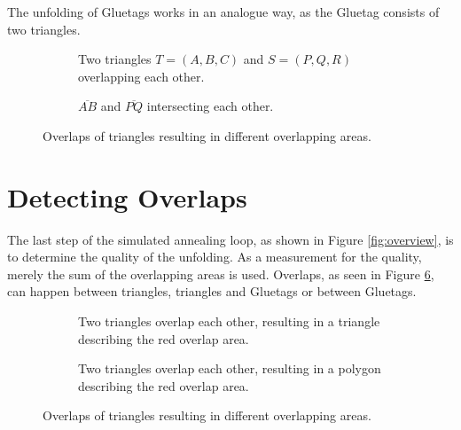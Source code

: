 \documentclass[draft,final]{vutinfth} %
\begin{document}
The unfolding of Gluetags works in an analogue way, as the Gluetag consists of two triangles.

\begin{figure}
\centering
\begin{subfigure}[t]{.4\textwidth}
	
  \caption{Two triangles $T = (A,B,C)$ and $S = (P,Q,R)$ overlapping each other.}
	\label{fig:figtrioverlap}
\end{subfigure}%
\hspace{.1\textwidth}
\begin{subfigure}[t]{.4\textwidth}
	
	\caption{$\overline{AB}$ and $\overline{PQ}$ intersecting each other.}
	\label{fig:figlineintersection}
\end{subfigure}
\caption{Overlaps of triangles resulting in different overlapping areas.}
\label{fig:overlapexample}
\end{figure}

\section{Detecting Overlaps}
\label{sec:overlaps}
The last step of the simulated annealing loop, as shown in Figure \ref{fig:overview}, is to determine the quality of the unfolding. As a measurement for the quality, merely the sum of the overlapping areas is used. Overlaps, as seen in Figure \ref{fig:overlap}, can happen between triangles, triangles and Gluetags or between Gluetags. 

\begin{figure}
\centering
\begin{subfigure}[t]{.4\textwidth}
    
  \caption{Two triangles overlap each other, resulting in a triangle describing the red overlap area.}
    \label{fig:overlap1}
\end{subfigure}%
\hspace{.1\textwidth}
\begin{subfigure}[t]{.4\textwidth}
    
    \caption{Two triangles overlap each other, resulting in a polygon describing the red overlap area.}
    \label{fig:overlap2}
\end{subfigure}
\caption{Overlaps of triangles resulting in different overlapping areas.}
\label{fig:overlap}
\end{figure}
\end{document}
